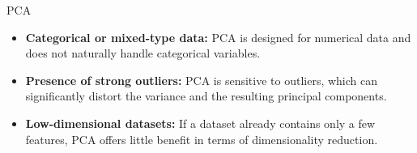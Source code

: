 \begin{exercise}{PCA}
\begin{itemize}
        \item \textbf{Categorical or mixed-type data:}  
        PCA is designed for numerical data and does not naturally handle categorical variables.

        \item \textbf{Presence of strong outliers:}  
        PCA is sensitive to outliers, which can significantly distort the variance and the resulting principal components.

        \item \textbf{Low-dimensional datasets:}  
        If a dataset already contains only a few features, PCA offers little benefit in terms of dimensionality reduction.
    \end{itemize}
    \end{exercise}
    
